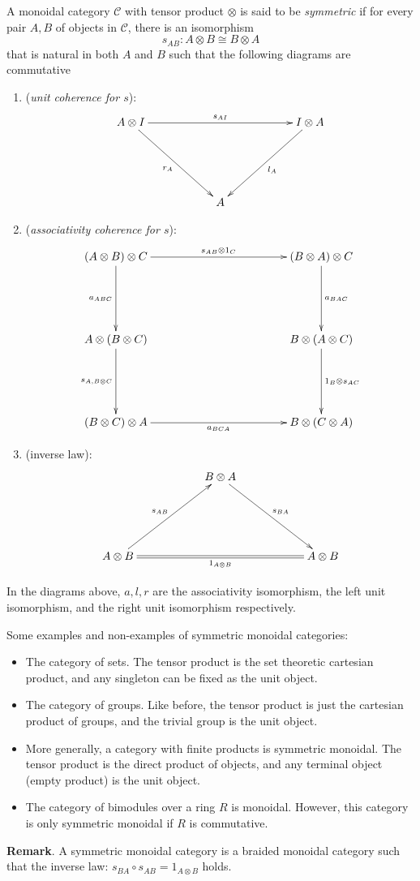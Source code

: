 \documentclass[12pt]{article}
\begin{document}
A monoidal category $\mathcal{C}$ with tensor product $\otimes$ is said to be \emph{symmetric} if for every pair $A,B$ of objects in $\mathcal{C}$, there is an isomorphism $$s_{AB}:A\otimes B\cong B\otimes A$$ that is natural in both $A$ and $B$ such that the following diagrams are commutative
\begin{enumerate}
\item (\emph{unit coherence for $s$}):
$$\xymatrix@+=2cm{A\otimes I \ar[rr]^{s_{AI}} \ar[dr]_{r_A} & & I\otimes A \ar[dl]^{l_A} \\ & A &}$$
\item (\emph{associativity coherence for $s$}):
$$\xymatrix@+=2cm{ (A\otimes B)\otimes C \ar[rr]^{s_{AB}\otimes 1_C} \ar[d]_{a_{ABC}} & & (B\otimes A)\otimes C \ar[d]^{a_{BAC}} \\ A\otimes (B\otimes C) \ar[d]_{s_{A,B\otimes C}} & & B\otimes (A\otimes C) \ar[d]^{1_B\otimes s_{AC}} \\ (B\otimes C)\otimes A \ar[rr]_{a_{BCA}} & & B\otimes(C\otimes A)
}$$
\item (inverse law):
$$\xymatrix@+=2cm{& B\otimes A \ar[dr]^{s_{BA}} & \\ A\otimes B \ar[ur]^{s_{AB}} \ar@{=}[rr]_{1_{A\otimes B}} && A\otimes B }$$
\end{enumerate}
In the diagrams above, $a,l,r$ are the associativity isomorphism, the left unit isomorphism, and the right unit isomorphism respectively.

Some examples and non-examples of symmetric monoidal categories:
\begin{itemize}
\item The category of sets.  The tensor product is the set theoretic cartesian product, and any singleton can be fixed as the unit object.
\item The category of groups.  Like before, the tensor product is just the cartesian product of groups, and the trivial group is the unit object.
\item More generally, a category with finite products is symmetric monoidal.  The tensor product is the direct product of objects, and any terminal object (empty product) is the unit object.
\item The category of bimodules over a ring $R$ is monoidal.  However, this category is only symmetric monoidal if $R$ is commutative.
\end{itemize}

\textbf{Remark}.  A symmetric monoidal category is a braided monoidal category such that the inverse law: $s_{BA}\circ s_{AB}=1_{A\otimes B}$ holds.
\end{document}
